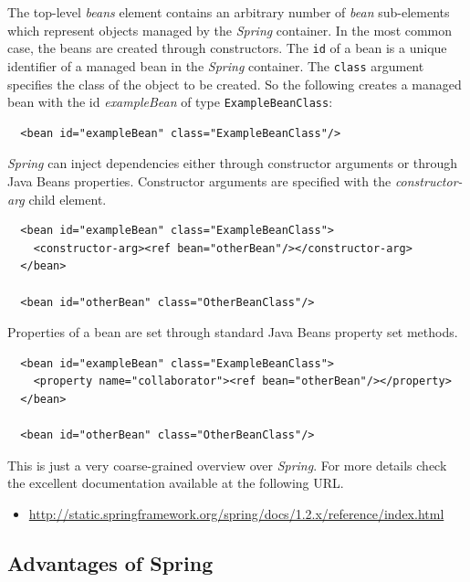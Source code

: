 The top-level \emph{beans} element contains an arbitrary number of \emph{bean}
sub-elements which represent objects managed by the \emph{Spring} container.
In the most common case, the beans are created through constructors. The
\texttt{id} of a bean is a unique identifier of a managed bean in the 
\emph{Spring} container. The \texttt{class} argument specifies the class
of the object to be created. So the following creates a managed bean
with the id \emph{exampleBean} of type \texttt{ExampleBeanClass}:

\small{\begin{verbatim}
  <bean id="exampleBean" class="ExampleBeanClass"/>  
\end{verbatim}}

\emph{Spring} can inject dependencies either through
constructor arguments or through Java Beans properties. Constructor arguments
are specified with the \emph{constructor-arg} child element.

\small{\begin{verbatim}
  <bean id="exampleBean" class="ExampleBeanClass">
    <constructor-arg><ref bean="otherBean"/></constructor-arg>
  </bean>
  
  <bean id="otherBean" class="OtherBeanClass"/>
\end{verbatim}}

Properties of a bean are set through standard Java Beans property set methods.

\small{\begin{verbatim}
  <bean id="exampleBean" class="ExampleBeanClass">
    <property name="collaborator"><ref bean="otherBean"/></property>
  </bean>
  
  <bean id="otherBean" class="OtherBeanClass"/>
\end{verbatim}}

This is just a very coarse-grained overview over \emph{Spring}. For more
details check the excellent documentation available at the following
URL.

\begin{itemize}
 \item \href{http://static.springframework.org/spring/docs/1.2.x/reference/index.html}{http://static.springframework.org/spring/docs/1.2.x/reference/index.html}
\end{itemize}


\subsection{Advantages of Spring}

